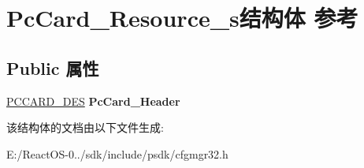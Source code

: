 \hypertarget{struct_pc_card___resource__s}{}\section{Pc\+Card\+\_\+\+Resource\+\_\+s结构体 参考}
\label{struct_pc_card___resource__s}
\subsection*{Public 属性}
\begin{DoxyCompactItemize}
\item 
\mbox{\label{struct_pc_card___resource__s_aad565d02811c3b6e519ae5164a4009d8}} 
\hyperlink{struct_pc_card___des__s}{P\+C\+C\+A\+R\+D\+\_\+\+D\+ES} {\bfseries Pc\+Card\+\_\+\+Header}
\end{DoxyCompactItemize}


该结构体的文档由以下文件生成\+:\begin{DoxyCompactItemize}
\item 
E\+:/\+React\+O\+S-\/0../sdk/include/psdk/cfgmgr32.\+h\end{DoxyCompactItemize}
